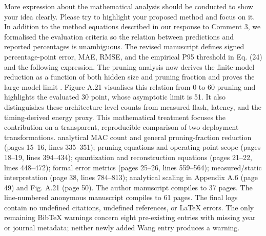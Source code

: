 {}
\markdownRendererSectionEnd \markdownRendererSectionBegin
{}\markdownRendererInterblockSeparator
{}\markdownRendererBlockQuoteBegin
More expression about the mathematical analysis should be conducted to show your idea clearly. Please try to highlight your proposed method and focus on it.\markdownRendererBlockQuoteEnd \markdownRendererInterblockSeparator
{} In addition to the method equations described in our response to Comment 3, we formalised the evaluation criteria so the relation between predictions and reported percentages is unambiguous. The revised manuscript defines signed percentage-point error, MAE, RMSE, and the empirical P95 threshold in Eq. (24) and the following expression. The pruning analysis now derives the finite-model reduction as a function of both hidden size and pruning fraction and proves the large-model limit . Figure A.21 visualises this relation from 0\markdownRendererPercentSign{} to 60\markdownRendererPercentSign{} pruning and highlights the evaluated 30\markdownRendererPercentSign{} point, whose asymptotic limit is 51\markdownRendererPercentSign{}. It also distinguishes these architecture-level counts from measured flash, latency, and the timing-derived energy proxy. This mathematical treatment focuses the contribution on a transparent, reproducible comparison of two deployment transformations.\markdownRendererParagraphSeparator
{} analytical MAC count and general pruning-fraction reduction (pages 15--16, lines 335--351); pruning equations and operating-point scope (pages 18--19, lines 394--434); quantization and reconstruction equations (pages 21--22, lines 448--472); formal error metrics (pages 25--26, lines 559--564); measured/static interpretation (page 38, lines 784--813); analytical scaling in Appendix A.6 (page 49) and Fig. A.21 (page 50).\markdownRendererInterblockSeparator
{}
\markdownRendererSectionEnd \markdownRendererSectionBegin
{}\markdownRendererInterblockSeparator
{}\markdownRendererUlBeginTight
\markdownRendererUlItem The author manuscript compiles to 37 pages.\markdownRendererUlItemEnd 
\markdownRendererUlItem The line-numbered anonymous manuscript compiles to 61 pages.\markdownRendererUlItemEnd 
\markdownRendererUlItem The final logs contain no undefined citations, undefined references, or LaTeX errors.\markdownRendererUlItemEnd 
\markdownRendererUlItem The only remaining BibTeX warnings concern eight pre-existing entries with missing year or journal metadata; neither newly added Wang entry produces a warning.\markdownRendererUlItemEnd 
\markdownRendererUlEndTight 
\markdownRendererSectionEnd 
\markdownRendererSectionEnd \markdownRendererDocumentEnd